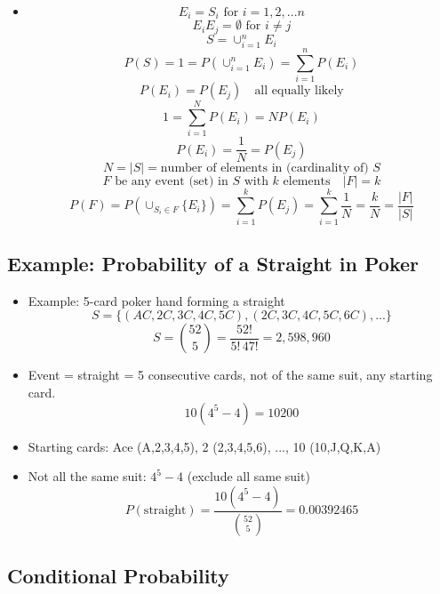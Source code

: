 \begin{itemize}
    \item \[ E_i = S_i \text{ for } i = 1, 2, ... n \]
          \[ E_i E_j = \emptyset \text{ for } i \neq j \]
          \[ S = \cup_{i=1}^{n} E_i \]
          \[ P(S) = 1 = P(\cup_{i=1}^{n} E_i) = \sum_{i=1}^{n} P(E_i) \]
          \[ P (E_i) = P(E_j) \quad \text{all equally likely} \]
          \[ 1 = \sum_{i=1}^{N} P(E_i) = N P(E_i) \]
          \[ P(E_i) = \frac{1}{N} = P(E_j) \]
          \[ N = |S| = \text{number of elements in (cardinality of) } S \]
          \[ F \text{ be any event (set) in } S \text{ with } k \text{ elements} \quad |F| = k \]
          \[ P(F) = P(\cup_{S_i \in F} \{E_i\}) = \sum_{i=1}^{k} P(E_j) = \sum_{i=1}^{k} \frac{1}{N} = \frac{k}{N} = \frac{|F|}{|S|} \]
\end{itemize}

\subsection{Example: Probability of a Straight in Poker}

\begin{itemize}
    \item Example: 5-card poker hand forming a straight
          \[ S = \{ (AC, 2C, 3C, 4C, 5C), (2C, 3C, 4C, 5C, 6C), ...\} \]
          \[ S = \binom{52}{5} = \frac{52!}{5! \, 47!} = 2,598,960 \]
    \item Event = straight = 5 consecutive cards, not of the same suit, any starting card.
          \[ 10 ( 4^5 - 4) = 10200 \]
    \item Starting cards: Ace (A,2,3,4,5), 2 (2,3,4,5,6), ..., 10 (10,J,Q,K,A)
    \item Not all the same suit: $4^5 - 4$ (exclude all same suit)
          \[ P (\text{straight}) = \frac{10(4^5 - 4)}{\binom{52}{5}} = 0.00392465 \]
\end{itemize}

\subsection{Conditional Probability}

